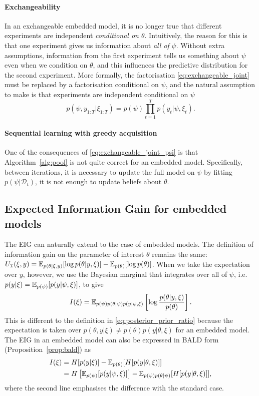 \documentclass[a4paper, 10pt]{report}
\theoremstyle{plain}
\begin{document}
	\paragraph{Exchangeability}
	In an exchangeable embedded model, it is no longer true that different experiments are independent \emph{conditional on $\theta$}.
	Intuitively, the reason for this is that one experiment gives us information about \emph{all of} $\psi$.
	Without extra assumptions, information from the first experiment tells us something about $\psi$ even when we condition on $\theta$, and this influences the predictive distribution for the second experiment.
	More formally, the factorisation \eqref{eq:exchangeable_joint} must be replaced by a factorisation conditional on $\psi$, and the natural assumption to make is that experiments are independent conditional on $\psi$
	\begin{equation}
	\label{eq:exchangeable_joint_psi}
	p(\psi,y_{1:T}|\xi_{1:T}) = p(\psi)\prod_{t=1}^T p(y_t|\psi,\xi_t).
	\end{equation}
	
	\paragraph{Sequential learning with greedy acquisition}
	One of the consequences of \eqref{eq:exchangeable_joint_psi} is that Algorithm~\ref{alg:pool} is not quite correct for an embedded model.
	Specifically, between iterations, it is necessary to update the full model on $\psi$ by fitting $p(\psi|\mathcal{D}_t)$, it is not enough to update beliefs about $\theta$.
	
	
	
	
	\subsection{Expected Information Gain for embedded models}
	\label{sec:embedded_eig}
	The EIG can naturally extend to the case of embedded models.
	The definition of information gain on the parameter of interest $\theta$ remains the same: $U_\mathcal{I}(\xi,y) = \mathbb{E}_{p(\theta|\xi,y)}[\log p(\theta|y,\xi)] - \mathbb{E}_{p(\theta)}[\log p(\theta)]$.
	When we take the expectation over $y$, however, we use the Bayesian marginal that integrates over all of $\psi$, i.e.~$p(y|\xi) = \mathbb{E}_{p(\psi)}[p(y|\psi,\xi)]$, to give
	\begin{equation}
	I(\xi) = \mathbb{E}_{p(\psi)p(\theta|\psi)p(y|\psi,\xi)}\left[\log \frac{p(\theta|y,\xi)}{p(\theta)} \right].
	\end{equation}
	This is different to the definition in \eqref{eq:posterior_prior_ratio} because the expectation is taken over $p(\theta,y|\xi) \ne p(\theta)p(y|\theta,\xi)$ for an embedded model.
	The EIG in an embedded model can also be expressed in BALD form (Proposition~\ref{prop:bald}) as
	\begin{align}
	I(\xi) &= H[p(y|\xi)] - \mathbb{E}_{p(\theta)}[H[p(y|\theta,\xi)]] \\
	&=H\left[\mathbb{E}_{p(\psi)}[p(y|\psi,\xi)]\right] - \mathbb{E}_{p(\psi)p(\theta|\psi)}[H[p(y|\theta,\xi)]],
	\end{align}
	where the second line emphasises the difference with the standard case.
	
\end{document}
